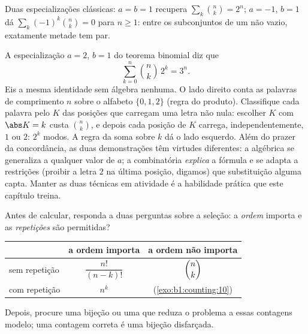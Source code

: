 \begin{example}\label{ex:b1:counting:binomial}
Duas especializações clássicas: $a = b = 1$ recupera $\sum_k \binom nk
= 2^n$; $a = -1$, $b = 1$ dá $\sum_{k} (-1)^k \binom nk = 0$ para
$n \geq 1$: entre os subconjuntos de um  não vazio, exatamente
metade tem  par.
\end{example}

\begin{example}\label{ex:b1:counting:threen}
A especialização $a = 2$, $b = 1$ do teorema binomial diz que
\[
\sum_{k=0}^{n} \binom nk\,2^k = 3^n .
\]
Eis a mesma identidade sem álgebra nenhuma. O lado direito
conta as palavras de comprimento $n$ sobre o alfabeto $\{0, 1, 2\}$
(regra do produto). Classifique cada palavra pelo  $K$ das
posições que carregam uma letra não nula: escolher $K$ com $\abs K = k$ custa
$\binom nk$, e depois cada posição de $K$ carrega, independentemente, $1$
ou $2$: $2^k$ modos. A regra da soma sobre $k$ dá o lado esquerdo.
Além do prazer da concordância, as duas demonstrações têm virtudes
diferentes: a algébrica se generaliza a qualquer valor de $a$; a
combinatória \emph{explica} a fórmula e se adapta a restrições
(proibir a letra $2$ na última posição, digamos) que substituição
alguma capta. Manter as duas técnicas em atividade é a habilidade
prática que este capítulo treina.
\end{example}

\begin{method}\label{met:b1:counting:which}
Antes de calcular, responda a duas perguntas sobre a seleção: a
\emph{ordem} importa e as \emph{repetições} são permitidas?
\begin{center}
\renewcommand{\arraystretch}{1.4}
\begin{tabular}{l|c|c}
 & a ordem importa & a ordem não importa \\
\hline
sem repetição & $\dfrac{n!}{(n-k)!}$ & $\dbinom{n}{k}$ \\[6pt]
com repetição & $n^k$ & (\cref{exo:b1:counting:10}) \\
\end{tabular}
\end{center}
Depois, procure uma bijeção ou uma  que reduza o problema a
essas contagens modelo; uma contagem correta é uma bijeção disfarçada.
\end{method}

